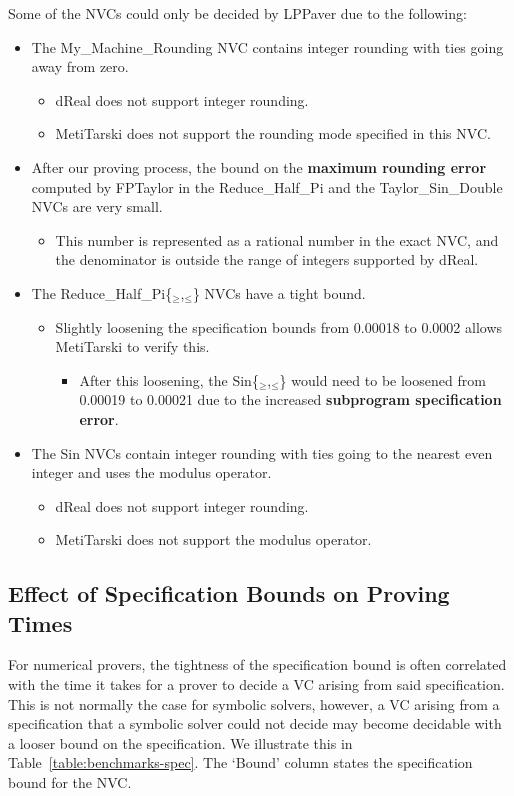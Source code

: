 \documentclass[runningheads]{llncs}
\begin{document}
Some of the NVCs could only be decided by LPPaver due to the following:
\begin{itemize}
  \item The My\_Machine\_Rounding NVC contains integer rounding with ties going away from zero.
  \begin{itemize}
    \item dReal does not support integer rounding.
    \item MetiTarski does not support the rounding mode specified in this NVC.
  \end{itemize}
  \item After our proving process, the bound on the \textbf{maximum rounding error} computed by FPTaylor in the Reduce\_Half\_Pi and the Taylor\_Sin\_Double NVCs are very small.
  \begin{itemize}
    \item This number is represented as a rational number in the exact NVC, and the denominator is outside the range of integers supported by dReal.
  \end{itemize} 
  \item The Reduce\_Half\_Pi\{${}_\ge$,${}_\le$\} NVCs have a tight bound.
  \begin{itemize}
    \item Slightly loosening the specification bounds from 0.00018 to 0.0002 allows MetiTarski to verify this.
    \begin{itemize}
      \item After this loosening, the Sin\{${}_\ge$,${}_\le$\} would need to be loosened from 0.00019 to 0.00021 due to the increased \textbf{subprogram specification error}.
    \end{itemize} 
  \end{itemize}
  \item The Sin NVCs contain integer rounding with ties going to the nearest even integer and uses the modulus operator.
  \begin{itemize}
    \item dReal does not support integer rounding.
    \item MetiTarski does not support the modulus operator.
  \end{itemize}
\end{itemize}

\subsection{Effect of Specification Bounds on Proving Times}
For numerical provers, the tightness of the specification bound is often correlated with the time it takes for a prover to decide a VC arising from said specification.
This is not normally the case for symbolic solvers, however, a VC arising from a specification that a symbolic solver could not decide may become decidable with a looser bound on the specification.
We illustrate this in Table~\ref{table:benchmarks-spec}.
The `Bound' column states the specification bound for the NVC.
\end{document}
